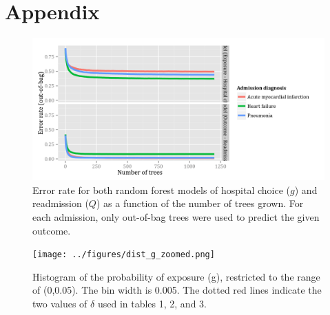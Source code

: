 \documentclass[]{article}\usepackage[]{graphicx}\usepackage[]{color}
\begin{document}
\printbibliography

\section{Appendix}
\begin{figure}[H]
    \includegraphics{../figures/error_rate_for_hospital_choice.png}
    \caption[Error rate for random forest model of hospital choice.]
      {Error rate for both random forest models of hospital choice ($g$) and readmission ($Q$) as a function of the number of trees grown. For each admission, only out-of-bag trees were used to predict the given outcome.}
    \label{fig:error_rate_for_hospital_choice}
\end{figure}


\begin{figure}[H]
    \texttt{[image: ../figures/dist\_g\_zoomed.png]}
    \caption[Histogram of the probability of exposure (g), restricted to the range of (0,0.05). The bin width is 0.005. The dotted red lines indicate the two values of $\delta$ used in tables 1, 2, and 3.]
      {Histogram of the probability of exposure (g), restricted to the range of (0,0.05). The bin width is 0.005. The dotted red lines indicate the two values of $\delta$ used in tables 1, 2, and 3.}
    \label{fig:dist_g_zoomed}
\end{figure}



\end{document}
